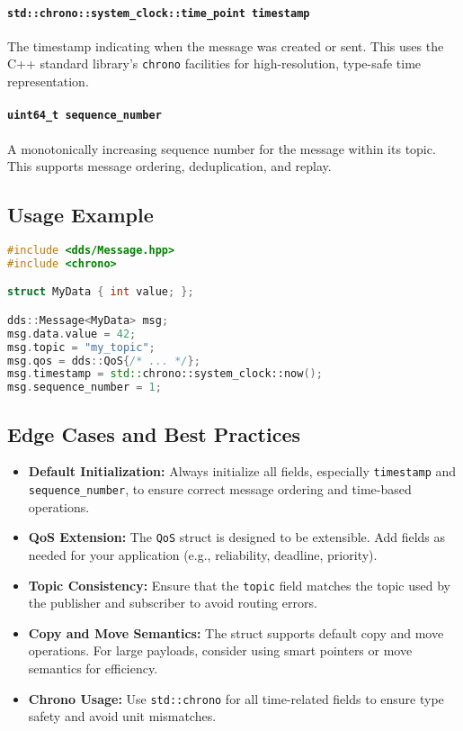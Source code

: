 \documentclass[12pt]{report}
\begin{document}
\paragraph{\texttt{std::chrono::system\_clock::time\_point timestamp}}
The timestamp indicating when the message was created or sent. This uses the C++ standard library's \texttt{chrono} facilities for high-resolution, type-safe time representation.

\paragraph{\texttt{uint64\_t sequence\_number}}
A monotonically increasing sequence number for the message within its topic. This supports message ordering, deduplication, and replay.

\subsection{Usage Example}
\begin{lstlisting}[language=C++]
#include <dds/Message.hpp>
#include <chrono>

struct MyData { int value; };

dds::Message<MyData> msg;
msg.data.value = 42;
msg.topic = "my_topic";
msg.qos = dds::QoS{/* ... */};
msg.timestamp = std::chrono::system_clock::now();
msg.sequence_number = 1;
\end{lstlisting}

\subsection{Edge Cases and Best Practices}
\begin{itemize}
    \item \textbf{Default Initialization:} Always initialize all fields, especially \texttt{timestamp} and \texttt{sequence\_number}, to ensure correct message ordering and time-based operations.
    \item \textbf{QoS Extension:} The \texttt{QoS} struct is designed to be extensible. Add fields as needed for your application (e.g., reliability, deadline, priority).
    \item \textbf{Topic Consistency:} Ensure that the \texttt{topic} field matches the topic used by the publisher and subscriber to avoid routing errors.
    \item \textbf{Copy and Move Semantics:} The struct supports default copy and move operations. For large payloads, consider using smart pointers or move semantics for efficiency.
    \item \textbf{Chrono Usage:} Use \texttt{std::chrono} for all time-related fields to ensure type safety and avoid unit mismatches.
\end{itemize}
\end{document}
